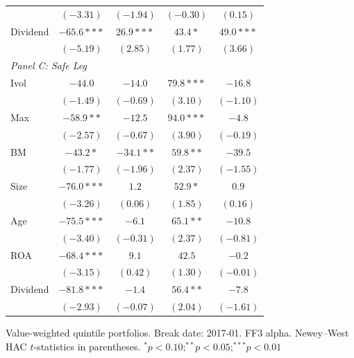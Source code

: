 \begin{tabular}{l c c c c}
 & $(-3.31)$ & $(-1.94)$ & $(-0.30)$ & $(0.15)$ \\
Dividend & $-65.6***$ & $26.9***$ & $43.4*$ & $49.0***$ \\
 & $(-5.19)$ & $(2.85)$ & $(1.77)$ & $(3.66)$ \\
\midrule
\multicolumn{5}{l}{\textit{Panel C: Safe Leg}} \\
Ivol & $-44.0$ & $-14.0$ & $79.8***$ & $-16.8$ \\
 & $(-1.49)$ & $(-0.69)$ & $(3.10)$ & $(-1.10)$ \\
Max & $-58.9**$ & $-12.5$ & $94.0***$ & $-4.8$ \\
 & $(-2.57)$ & $(-0.67)$ & $(3.90)$ & $(-0.19)$ \\
BM & $-43.2*$ & $-34.1**$ & $59.8**$ & $-39.5$ \\
 & $(-1.77)$ & $(-1.96)$ & $(2.37)$ & $(-1.55)$ \\
Size & $-76.0***$ & $1.2$ & $52.9*$ & $0.9$ \\
 & $(-3.26)$ & $(0.06)$ & $(1.85)$ & $(0.16)$ \\
Age & $-75.5***$ & $-6.1$ & $65.1**$ & $-10.8$ \\
 & $(-3.40)$ & $(-0.31)$ & $(2.37)$ & $(-0.81)$ \\
ROA & $-68.4***$ & $9.1$ & $42.5$ & $-0.2$ \\
 & $(-3.15)$ & $(0.42)$ & $(1.30)$ & $(-0.01)$ \\
Dividend & $-81.8***$ & $-1.4$ & $56.4**$ & $-7.8$ \\
 & $(-2.93)$ & $(-0.07)$ & $(2.04)$ & $(-1.61)$ \\
\bottomrule
\end{tabular}
\vspace{4pt}
\begin{minipage}{0.9\textwidth}
\footnotesize
Value-weighted quintile portfolios. Break date: 2017-01. FF3 alpha.
Newey--West HAC $t$-statistics in parentheses.
$^{*}p<0.10$;\quad $^{**}p<0.05$;\quad $^{***}p<0.01$
\end{minipage}
